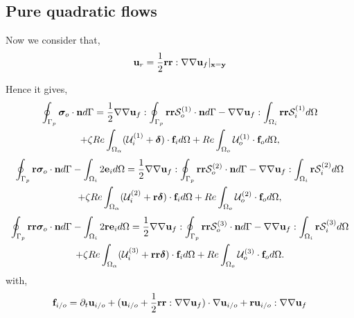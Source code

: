 \subsection{Pure quadratic flows}
Now we consider that, 
\begin{equation}
    \textbf{u}_r = \frac{1}{2}\textbf{rr} : \grad\grad \textbf{u}_f |_{\textbf{x}=\textbf{y}}
\end{equation}

Hence it gives, 
\begin{multline}
    \intS[p]{\bm\sigma_{o}\cdot \textbf{n}}
    =
    \frac{1}{2}\grad\grad \textbf{u}_f : \intS[p]{\textbf{rr} \mathcal{S}_o^{(1)} \cdot \textbf{n}}
    -\grad\grad \textbf{u}_f:\intO[i]{ \textbf{rr}\mathcal{S}_{i}^{(1)}} 
    \\ 
    + \zeta Re \intO{(\mathcal{U}_{i}^{(1)} + \bm\delta)\cdot \textbf{f}_{i}} 
    + Re\intO[o]{\mathcal{U}_{o}^{(1)}\cdot \textbf{f}_{o}},
\end{multline}
\begin{multline}
    \intS[p]{\textbf{r}  \bm\sigma_{o}\cdot \textbf{n}}
    - \intO[i]{2\textbf{e}_i}
    =
    \frac{1}{2}\grad\grad \textbf{u}_f : \intS[p]{\textbf{rr}  \mathcal{S}_o^{(2)}\cdot \textbf{n}}
    -\grad\grad \textbf{u}_f:\intO[i]{ \textbf{r}\mathcal{S}_i^{(2)}} 
    \\ 
    + \zeta Re \intO{(\mathcal{U}_{i}^{(2)}  + \textbf{r}\bm\delta)\cdot \textbf{f}_{i}} 
    + Re\intO[o]{\mathcal{U}_{o}^{(2)}\cdot \textbf{f}_{o}},
\end{multline}
\begin{multline}
    \intS[p]{\textbf{rr}  \bm\sigma_{o}\cdot \textbf{n}}
    - \intO[i]{2\textbf{re}_i }
    =
    \frac{1}{2}\grad\grad \textbf{u}_f : \intS[p]{\textbf{rr} \mathcal{S}_o^{(3)}\cdot \textbf{n}}
    -\grad\grad \textbf{u}_f : \intO[i]{\textbf{r}\mathcal{S}_i^{(3)}}\\
    + \zeta Re \intO{(\mathcal{U}_{i}^{(3)} + \textbf{rr}\bm\delta)\cdot \textbf{f}_{i}} 
    + Re\intO[o]{\mathcal{U}_{o}^{(3)} \cdot \textbf{f}_{o}}.
\end{multline}
with, 
\begin{equation}
    \textbf{f}_{i/o}
    =
    \pddt \textbf{u}_{i/o}
    + 
    (\textbf{u}_{i/o} + \frac{1}{2}\textbf{rr} : \grad\grad \textbf{u}_f)\cdot \grad \textbf{u}_{i/o}
    + \textbf{r}\textbf{u}_{i/o} : \grad\grad \textbf{u}_f
\end{equation}
